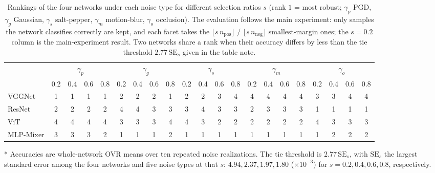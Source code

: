 \begin{table}[htbp]
	\caption{Rankings of the four networks under each noise type for different selection ratios $s$ (rank $1$ = most robust; $\gamma_p$ PGD, $\gamma_g$ Gaussian, $\gamma_s$ salt-pepper, $\gamma_m$ motion-blur, $\gamma_o$ occlusion). The evaluation follows the main experiment: only samples the network classifies correctly are kept, and each facet takes the $\lfloor s\,n_{\mathrm{pos}}\rfloor$ / $\lfloor s\,n_{\mathrm{neg}}\rfloor$ smallest-margin ones; the $s=0.2$ column is the main-experiment result. Two networks share a rank when their accuracy differs by less than the tie threshold $2.77\,\mathrm{SE}_s$ given in the table note.}
	\label{tab:rank_s_maincal}
	\centering
	\setlength{\tabcolsep}{4pt}
	\begin{threeparttable}
		\begin{tabular}{l*{20}{c}}
			\toprule
			\multicolumn{1}{c}{} & \multicolumn{4}{c}{$\gamma_p$} & \multicolumn{4}{c}{$\gamma_g$} & \multicolumn{4}{c}{$\gamma_s$} & \multicolumn{4}{c}{$\gamma_m$} & \multicolumn{4}{c}{$\gamma_o$} \\
			\cmidrule(lr){2-5} \cmidrule(lr){6-9} \cmidrule(lr){10-13} \cmidrule(lr){14-17} \cmidrule(lr){18-21}
			\multicolumn{1}{c}{} & 0.2 & 0.4 & 0.6 & 0.8 & 0.2 & 0.4 & 0.6 & 0.8 & 0.2 & 0.4 & 0.6 & 0.8 & 0.2 & 0.4 & 0.6 & 0.8 & 0.2 & 0.4 & 0.6 & 0.8 \\
			\midrule
			VGGNet & 1 & 1 & 1 & 1 & 2 & 2 & 2 & 1 & 2 & 2 & 3 & 4 & 4 & 4 & 4 & 4 & 3 & 3 & 4 & 4 \\
			ResNet & 2 & 2 & 2 & 2 & 4 & 4 & 3 & 3 & 3 & 4 & 3 & 3 & 2 & 3 & 3 & 3 & 1 & 1 & 1 & 1 \\
			ViT & 4 & 4 & 4 & 4 & 3 & 3 & 3 & 4 & 4 & 3 & 2 & 2 & 2 & 2 & 2 & 2 & 4 & 3 & 3 & 3 \\
			MLP-Mixer & 3 & 3 & 3 & 2 & 1 & 1 & 1 & 2 & 1 & 1 & 1 & 1 & 1 & 1 & 1 & 1 & 1 & 2 & 2 & 2 \\
			\bottomrule
		\end{tabular}
		\begin{tablenotes}
			\footnotesize
			\item[*] Accuracies are whole-network OVR means over ten repeated noise realizations. The tie threshold is $2.77\,\mathrm{SE}_s$, with $\mathrm{SE}_s$ the largest standard error among the four networks and five noise types at that $s$: $4.94, 2.37, 1.97, 1.80$ ($\times 10^{-3}$) for $s = 0.2, 0.4, 0.6, 0.8$, respectively.
		\end{tablenotes}
	\end{threeparttable}
\end{table}
